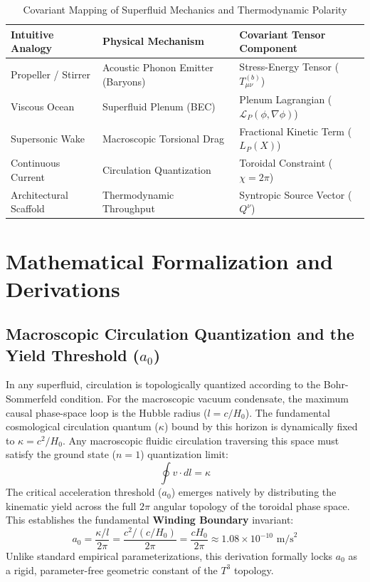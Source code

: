 \documentclass[aps,prd,10pt,twocolumn,superscriptaddress,nofootinbib,floatfix]{revtex4-2}
\begin{document}
\begin{table}[htbp]
\centering
\caption{\footnotesize Covariant Mapping of Superfluid Mechanics and Thermodynamic Polarity}
\label{tab:covariant}
\begin{tabular}{lll}
\toprule
\textbf{Intuitive Analogy} & \textbf{Physical Mechanism} & \textbf{Covariant Tensor Component} \\
\midrule
Propeller / Stirrer & Acoustic Phonon Emitter (Baryons) & Stress-Energy Tensor ($T_{\mu\nu}^{(b)}$) \\
Viscous Ocean & Superfluid Plenum (BEC) & Plenum Lagrangian ($\mathcal{L}_P(\phi,\nabla\phi)$) \\
Supersonic Wake & Macroscopic Torsional Drag & Fractional Kinetic Term ($L_P(X)$) \\
Continuous Current & Circulation Quantization & Toroidal Constraint ($\chi=2\pi$) \\
Architectural Scaffold & Thermodynamic Throughput & Syntropic Source Vector ($Q^\nu$) \\
\bottomrule
\end{tabular}
\end{table}

\section{\label{sec:math}Mathematical Formalization and Derivations}

\subsection{Macroscopic Circulation Quantization and the Yield Threshold (\texorpdfstring{$a_0$}{a0})}
In any superfluid, circulation is topologically quantized according to the Bohr-Sommerfeld condition. For the macroscopic vacuum condensate, the maximum causal phase-space loop is the Hubble radius ($l = c/H_0$). The fundamental cosmological circulation quantum ($\kappa$) bound by this horizon is dynamically fixed to $\kappa = c^2/H_0$. Any macroscopic fluidic circulation traversing this space must satisfy the ground state ($n=1$) quantization limit:
\begin{equation}
\oint v \cdot dl = \kappa
\end{equation}
The critical acceleration threshold ($a_0$) emerges natively by distributing the kinematic yield across the full $2\pi$ angular topology of the toroidal phase space. This establishes the fundamental \textbf{Winding Boundary} invariant:
\begin{equation}
a_0 = \frac{\kappa / l}{2\pi} = \frac{c^2 / (c/H_0)}{2\pi} = \frac{c H_0}{2\pi} \approx 1.08 \times 10^{-10} \text{ m/s}^2
\end{equation}
Unlike standard empirical parameterizations, this derivation formally locks $a_0$ as a rigid, parameter-free geometric constant of the $T^3$ topology.
\end{document}
